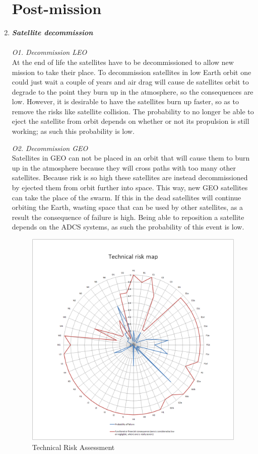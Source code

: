 \begin{enumerate}[A]
\section{Post-mission}
\label{blTRAPm}
	\item\textbf{\textit{Satellite decommission}} \\\\
\textit{O1. Decommission LEO}\\ 
At the end of life the satellites have to be decommissioned to allow new mission to take their place. To decommission satellites in low Earth orbit one could just wait a couple of years and air drag will cause de satellites orbit to degrade to the point they burn up in the atmosphere, so the consequences are low. However, it is desirable to have the satellites burn up faster, so as to remove the risks like satellite collision. The probability to no longer be able to eject the satellite from orbit depends on whether or not its propulsion is still working; as such this probability is low.

\textit{O2. Decommission GEO}\\ 
Satellites in GEO can not be placed in an orbit that will cause them to burn up in the atmosphere because they will cross paths with too many other satellites. Because risk is so high these satellites are instead decommissioned by ejected them from orbit further into space. This way, new GEO satellites can take the place of the swarm. If this in the dead satellites will continue orbiting the Earth, wasting space that can be used by other satellites, as a result the consequence of failure is high. Being able to reposition a satellite depends on the ADCS systems, as such the probability of this event is low.

\begin{figure} [h]
	\begin{center}
 \includegraphics[width=1.0\textwidth,angle=0]{chapters/img/TRA_RM.png}	
	\caption{Technical Risk Assessment}
	\label{TRA_RM}
	\end{center}
\end{figure}

\end{enumerate}